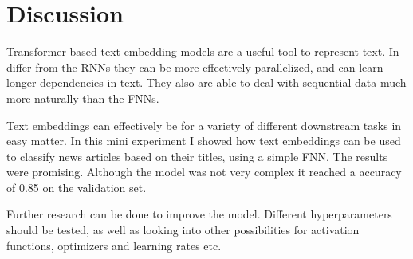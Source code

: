 \section{Discussion}
Transformer based text embedding models are 
a useful tool to represent text. In differ from the
RNNs they can be more effectively parallelized,
and can learn longer dependencies in text. They also 
are able to deal with sequential data much more naturally
than the FNNs.

Text embeddings can
effectively be for a variety of different downstream tasks in 
easy matter. In this mini experiment I showed how text embeddings
can be used to classify news articles based on their titles, using a simple
FNN. The results were promising. Although the model was not very complex
it reached a accuracy of 0.85 on the validation set. 

Further research can be done to improve the model. 
Different hyperparameters should be tested, as well as looking into other 
possibilities for activation functions, optimizers and learning rates etc.


